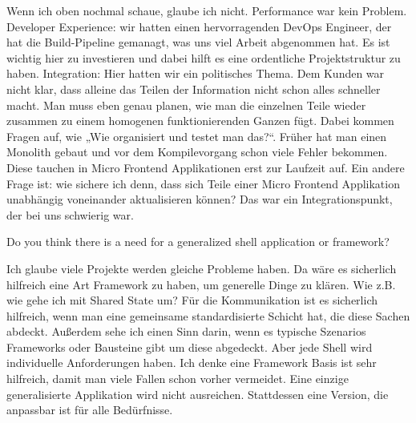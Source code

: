 \begin{description}
    \BerndOlleck Wenn ich oben nochmal schaue, glaube ich nicht. Performance war kein Problem. Developer Experience: wir hatten einen hervorragenden DevOps Engineer, der hat die Build-Pipeline gemanagt, was uns viel Arbeit abgenommen hat. Es ist wichtig hier zu investieren und dabei hilft es eine ordentliche Projektstruktur zu haben.
    Integration: Hier hatten wir ein politisches Thema. Dem Kunden war nicht klar, dass alleine das Teilen der Information nicht schon alles schneller macht. Man muss eben genau planen, wie man die einzelnen Teile wieder zusammen zu einem homogenen funktionierenden Ganzen fügt. Dabei kommen Fragen auf, wie „Wie organisiert und testet man das?“. Früher hat man einen Monolith gebaut und vor dem Kompilevorgang schon viele Fehler bekommen. Diese tauchen in Micro Frontend Applikationen erst zur Laufzeit auf.
    Ein andere Frage ist: wie sichere ich denn, dass sich Teile einer Micro Frontend Applikation unabhängig voneinander aktualisieren können? Das war ein Integrationspunkt, der bei uns schwierig war.

    \NicoVogel Do you think there is a need for a generalized shell application or framework?

    \BerndOlleck Ich glaube viele Projekte werden gleiche Probleme haben. Da wäre es sicherlich hilfreich eine Art Framework zu haben, um generelle Dinge zu klären. Wie z.B. wie gehe ich mit Shared State um? Für die Kommunikation ist es sicherlich hilfreich, wenn man eine gemeinsame standardisierte Schicht hat, die diese Sachen abdeckt. Außerdem sehe ich einen Sinn darin, wenn es typische Szenarios Frameworks oder Bausteine gibt um diese abgedeckt. Aber jede Shell wird individuelle Anforderungen haben. Ich denke eine Framework Basis ist sehr hilfreich, damit man viele Fallen schon vorher vermeidet. Eine einzige generalisierte Applikation wird nicht ausreichen. Stattdessen eine Version, die anpassbar ist für alle Bedürfnisse.

\end{description}